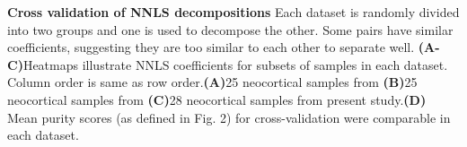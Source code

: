 \textbf{Cross validation of NNLS decompositions}
 Each dataset is randomly divided into two groups and one is used to decompose the other. Some pairs have similar coefficients, suggesting they are too similar to each other to separate well. \textbf{(A-C)}Heatmaps illustrate NNLS coefficients for subsets of samples in each dataset. Column order is same as row order.\textbf{(A)}25 neocortical samples from \cite{Tasic_2018} \textbf{(B)}25 neocortical samples from \cite{Zeisel_2018}\textbf{(C)}28 neocortical samples from present study.\textbf{(D)} Mean purity scores (as defined in Fig. 2) for cross-validation were comparable in each dataset.
 
